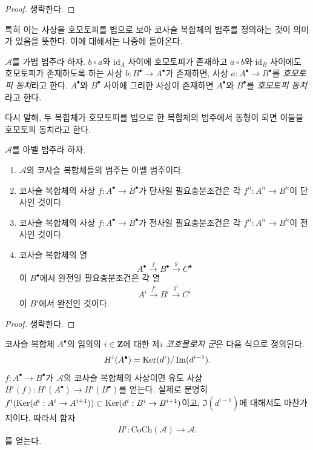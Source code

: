 \begin{proof}
생략한다.
\end{proof}

\noindent
특히 이는 사상을 호모토피를 법으로 보아 코사슬 복합체의 범주를
정의하는 것이 의미가 있음을 뜻한다. 이에 대해서는 나중에 돌아온다.

\begin{definition}
\label{definition-homotopy-equivalent-cochain}
$\mathcal{A}$를 가법 범주라 하자.
$b \circ a$와 $\text{id}_A$ 사이에 호모토피가 존재하고
$a \circ b$와 $\text{id}_B$ 사이에도 호모토피가 존재하도록 하는
사상 $b : B^\bullet \to A^\bullet$가 존재하면, 사상
$a : A^\bullet \to B^\bullet$를 {\it 호모토피 동치}라고 한다.
$A^\bullet$와 $B^\bullet$ 사이에 그러한 사상이 존재하면
$A^\bullet$와 $B^\bullet$를 {\it 호모토피 동치}라고 한다.
\end{definition}

\noindent
다시 말해, 두 복합체가 호모토피를 법으로 한 복합체의 범주에서
동형이 되면 이들을 호모토피 동치라고 한다.

\begin{lemma}
\label{lemma-cat-cochain-abelian}
$\mathcal{A}$를 아벨 범주라 하자.
\begin{enumerate}
\item $\mathcal{A}$의 코사슬 복합체들의 범주는 아벨 범주이다.
\item 코사슬 복합체의 사상 $f : A^\bullet \to B^\bullet$가 단사일
필요충분조건은 각 $f^n : A^n \to B^n$이 단사인 것이다.
\item 코사슬 복합체의 사상 $f : A^\bullet \to B^\bullet$가 전사일
필요충분조건은 각 $f^n : A^n \to B^n$이 전사인 것이다.
\item 코사슬 복합체의 열
$$
A^\bullet \xrightarrow{f} B^\bullet \xrightarrow{g} C^\bullet
$$
이 $B^\bullet$에서 완전일 필요충분조건은 각 열
$$
A^i \xrightarrow{f^i} B^i \xrightarrow{g^i} C^i
$$
이 $B^i$에서 완전인 것이다.
\end{enumerate}
\end{lemma}

\begin{proof}
생략한다.
\end{proof}

\noindent
코사슬 복합체 $A^\bullet$의 임의의 $i \in \mathbf{Z}$에 대한 제$i$
{\it 코호몰로지 군}은 다음 식으로 정의된다.
$$
H^i(A^\bullet) = \mathop{\mathrm{Ker}}(d^i)/\mathop{\mathrm{Im}}(d^{i - 1}).
$$
$f : A^\bullet \to B^\bullet$가 $\mathcal{A}$의 코사슬 복합체의
사상이면 유도 사상 $H^i(f) : H^i(A^\bullet) \to H^i(B^\bullet)$를
얻는다. 실제로 분명히
$f^i(\mathop{\mathrm{Ker}}(d^i : A^i \to A^{i + 1})) \subset
\mathop{\mathrm{Ker}}(d^i : B^i \to B^{i + 1})$이고, $\Im(d^{i - 1})$에 대해서도
마찬가지이다. 따라서 함자
$$
H^i : \text{CoCh}(\mathcal{A}) \longrightarrow \mathcal{A}.
$$
를 얻는다.

